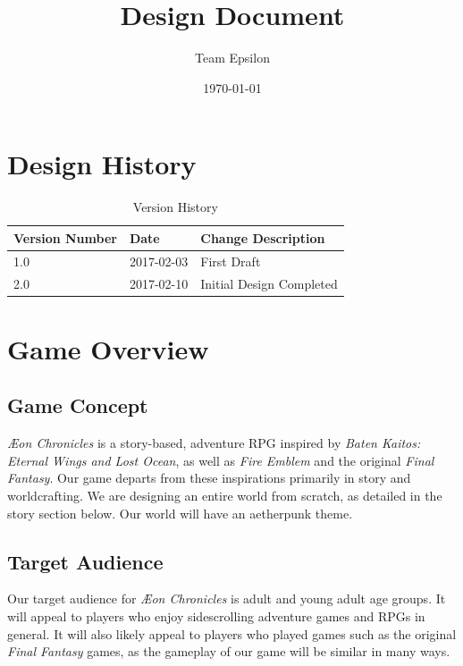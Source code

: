 \documentclass[12pt,titlepage]{article}
\title{\gametitle Design Document}
\author{Team Epsilon}
\date{\today}
\newcommand\gametitle{\textit{\AE on Chronicles}\xspace}
\begin{document}
\maketitle

\tableofcontents
\newpage
\listoffigures
\newpage
\listoftables


\newpage
\section{Design History}
\begin{table}[H]
    \caption{Version History}
    \label{tbl:version_history}
    \centering
    \begin{tabularx}{\linewidth}{| l | l || X |}
        \hline
        \textbf{Version Number} & \textbf{Date} & \textbf{Change Description} \\
        \hline\hline
        1.0 & 2017-02-03 & First Draft \\
        \hline
        2.0 & 2017-02-10 & Initial Design Completed \\
        \hline
    \end{tabularx}
\end{table}

\newpage
\section{Game Overview}
\subsection{Game Concept}
\gametitle is a story-based, adventure RPG inspired by \textit{Baten Kaitos:
Eternal Wings and Lost Ocean}, as well as \textit{Fire Emblem} and the original
\textit{Final Fantasy}. Our game departs from these inspirations primarily
in story and worldcrafting. We are designing an entire world from scratch, as
detailed in the story section below. Our world will have an aetherpunk theme.

\subsection{Target Audience}
Our target audience for \gametitle is adult and young adult age groups. It will
appeal to players who enjoy sidescrolling adventure games and RPGs in general.
It will also likely appeal to players who played games such as the original
\textit{Final Fantasy} games, as the gameplay of our game will be similar in
many ways.
\end{document}
